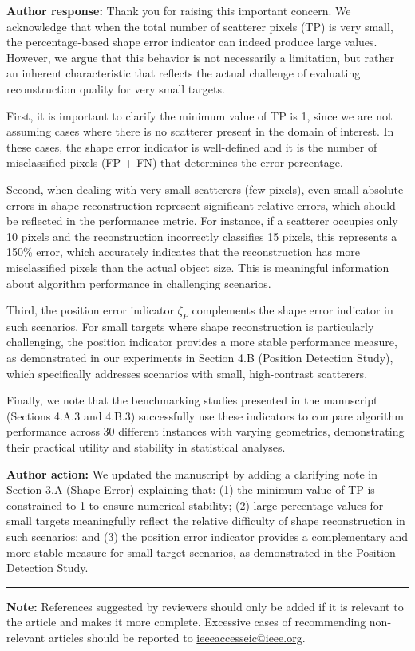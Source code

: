 \documentclass[12pt, a4paper]{article}
\newcommand{\response}[1]{
    \noindent \textbf{Author response:} #1
    \par\vspace{0.3cm}
}
\newcommand{\action}[1]{
    \noindent \textbf{Author action:} #1
    \par\vspace{0.5cm}
}
\begin{document}
\response{Thank you for raising this important concern. We acknowledge that when the total number of scatterer pixels (TP) is very small, the percentage-based shape error indicator can indeed produce large values. However, we argue that this behavior is not necessarily a limitation, but rather an inherent characteristic that reflects the actual challenge of evaluating reconstruction quality for very small targets.

First, it is important to clarify the minimum value of TP is 1, since we are not assuming cases where there is no scatterer present in the domain of interest. In these cases, the shape error indicator is well-defined and it is the number of misclassified pixels (FP + FN) that determines the error percentage.

Second, when dealing with very small scatterers (few pixels), even small absolute errors in shape reconstruction represent significant relative errors, which should be reflected in the performance metric. For instance, if a scatterer occupies only 10 pixels and the reconstruction incorrectly classifies 15 pixels, this represents a 150\% error, which accurately indicates that the reconstruction has more misclassified pixels than the actual object size. This is meaningful information about algorithm performance in challenging scenarios.

Third, the position error indicator $\zeta_P$ complements the shape error indicator in such scenarios. For small targets where shape reconstruction is particularly challenging, the position indicator provides a more stable performance measure, as demonstrated in our experiments in Section 4.B (Position Detection Study), which specifically addresses scenarios with small, high-contrast scatterers.

Finally, we note that the benchmarking studies presented in the manuscript (Sections 4.A.3 and 4.B.3) successfully use these indicators to compare algorithm performance across 30 different instances with varying geometries, demonstrating their practical utility and stability in statistical analyses.}

\action{We updated the manuscript by adding a clarifying note in Section 3.A (Shape Error) explaining that: (1) the minimum value of TP is constrained to 1 to ensure numerical stability; (2) large percentage values for small targets meaningfully reflect the relative difficulty of shape reconstruction in such scenarios; and (3) the position error indicator provides a complementary and more stable measure for small target scenarios, as demonstrated in the Position Detection Study.}



\vspace{2cm}
\hrule
\vspace{0.5cm}
\noindent \small{\textbf{Note:} References suggested by reviewers should only be added if it is relevant to the article and makes it more complete. Excessive cases of recommending non-relevant articles should be reported to \url{ieeeaccesseic@ieee.org}.}



\end{document}
